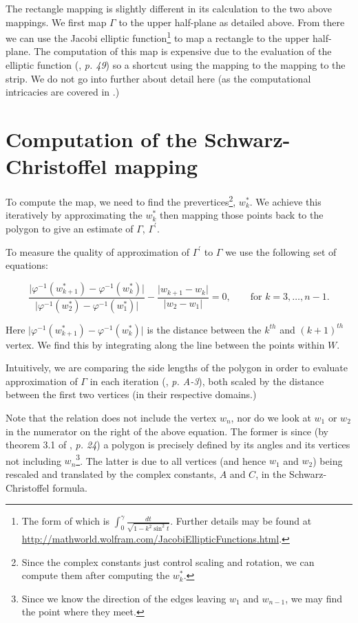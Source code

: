 \documentclass[a4paper,10pt]{amsart}
\newcommand{\sch}{Schwarz-Christoffel }
\newcommand{\phiinv}{\phi^{-1}}
\renewcommand{\phi}{\varphi}
\begin{document}
The rectangle mapping is slightly different in its calculation to the two above mappings. We first map $\Gamma$ to the upper half-plane as detailed above. From there we can use the Jacobi elliptic function\footnote{The form of which is $\int_0^\gamma \frac{dt}{\sqrt{1-k^2\sin^2t}}$. Further details may be found at \url{http://mathworld.wolfram.com/JacobiEllipticFunctions.html}.} to map a rectangle to the upper half-plane. The computation of this map is expensive due to the evaluation of the elliptic function (\cite{driscoll}, \emph{p. 49}) so a shortcut using the mapping to the mapping to the strip. We do not go into further about detail here (as the computational intricacies are covered in \cite{howell90}.)



\section{Computation of the \sch mapping}

To compute the map, we need to find the prevertices\footnote{Since the complex constants just control scaling and rotation, we can compute them after computing the $w^*_k$.}, $w^*_k$. We achieve this iteratively by approximating the $w^*_k$ then mapping those points back to the polygon to give an estimate of $\Gamma$, $\Gamma^\prime$. 

To measure the quality of approximation of $\Gamma^\prime$ to $\Gamma$ we use the following set of equations:

\begin{equation}
\label{optimizeme}
\frac{\vert \phiinv(w^*_{k+1}) -  \phiinv(w^*_k) \vert}{\vert \phiinv(w^*_2)-\phiinv(w^*_1)\vert} - \frac{\vert w_{k+1} - w_k\vert}{\vert w_2 - w_1\vert} = 0, \qquad \text{for } k=3,\dots,n-1.
\end{equation}

Here $\vert \phiinv(w^*_{k+1}) -  \phiinv(w^*_k) \vert$ is the distance between the $k^{th}$ and $(k+1)^{th}$ vertex.  We find this by integrating along the line between the points within $W$.

Intuitively, we are comparing the side lengths of the polygon in order to evaluate approximation of $\Gamma$ in each iteration (\cite{snider}, \emph{p. A-3}), both scaled by the distance between the first two vertices (in their respective domains.)

Note that the relation does not include the vertex $w_n$, nor do we look at $w_1$ or $w_2$ in the numerator on the right of the above equation. The former is since (by theorem 3.1 of \cite{driscoll}, \emph{p. 24}) a polygon is precisely defined by its angles and its vertices not including $w_n$\footnote{Since we know the direction of the edges leaving $w_1$ and $w_{n-1}$, we may find the point where they meet.}. The latter is due to all vertices (and hence $w_1$ and $w_2$) being rescaled and translated by the complex constants, $A$ and $C$, in the \sch formula.
\end{document}
